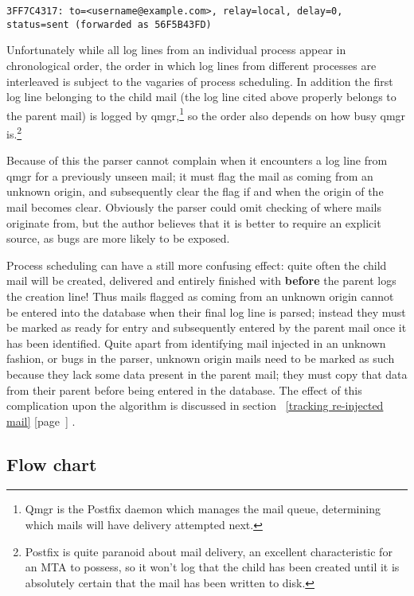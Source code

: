 \documentclass[a4paper,12pt,draft]{article}
\newcommand{\refwithpage}[1]{%
    \empty{}\ref{#1} [page~\pageref{#1}]%
}
\begin{document}
\texttt{3FF7C4317: to=<username@example.com>, relay=local, \newline
delay=0, status=sent (forwarded as 56F5B43FD)}

Unfortunately while all log lines from an individual process appear in
chronological order, the order in which log lines from different processes
are interleaved is subject to the vagaries of process scheduling.  In
addition the first log line belonging to the child mail (the log line cited
above properly belongs to the parent mail) is logged by qmgr,\footnote{Qmgr
is the Postfix daemon which manages the mail queue, determining which mails
will have delivery attempted next.} so the order also depends on how busy
qmgr is.\footnote{Postfix is quite paranoid about mail delivery, an
excellent characteristic for an MTA to possess, so it won't log that the
child has been created until it is absolutely certain that the mail has
been written to disk.}

Because of this the parser cannot complain when it encounters a log line
from qmgr for a previously unseen mail; it must flag the mail as coming
from an unknown origin, and subsequently clear the flag if and when the
origin of the mail becomes clear.  Obviously the parser could omit checking
of where mails originate from, but the author believes that it is better to
require an explicit source, as bugs are more likely to be exposed.

Process scheduling can have a still more confusing effect: quite often the
child mail will be created, delivered and entirely finished with
\textbf{before} the parent logs the creation line!  Thus mails flagged as
coming from an unknown origin cannot be entered into the database when
their final log line is parsed; instead they must be marked as ready for
entry and subsequently entered by the parent mail once it has been
identified.  Quite apart from identifying mail injected in an unknown
fashion, or bugs in the parser, unknown origin mails need to be marked as
such because they lack some data present in the parent mail; they must copy
that data from their parent before being entered in the database.  The
effect of this complication upon the algorithm is discussed in
section~\refwithpage{tracking re-injected mail}.



\newpage
\subsection{Flow chart}
\end{document}
